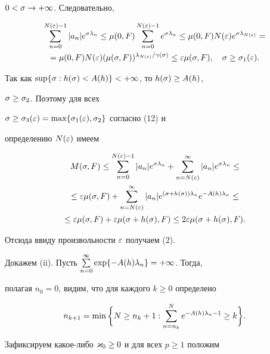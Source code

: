 $0<\sigma\to+\infty$. Следовательно, 


\begin{gather}


\sum_{n=0}^{N(\e)-1}|a_n|e^{\s\l_n}\le


\mu(0,F)\sum_{n=0}^{N(\e)-1}e^{\s\l_n}\le


\mu(0,F)N(\e)e^{\s\l_{N(\e)}}=\notag\\


=\mu(0,F)N(\e)(\m)^{\l_{N(\e)}/\g(\s)}\le


\e\m,\q \s\ge\s_1(\e).


\end{gather}





Так как $\sup\{\sigma:h(\sigma)<A(h)\}<+\infty$, то $h(\sigma)\ge A(h)$,


$\sigma\ge\sigma_2$. Поэтому для всех


$\sigma\ge\sigma_3(\varepsilon)=\max\{\sigma_1(\varepsilon),\sigma_2\}$ согласно (12) и


определению $N(\varepsilon)$ имеем


\begin{gather*}


\M\le\sum_{n=0}^{N(\e)-1}|a_n|e^{\s\l_n}+


\sum_{n=N(\e)}^\i |a_n|e^{\s\l_n}\le\\


\le \e\m+\sum_{n=N(\e)}^\i


|a_n|e^{(\s+h(\s))\l_n}e^{-A(h)\l_n}\le \\


\le\e\m+\e\mu(\s+h(\s),F)\le2\e\mu(\s+h(\s),F).


\end{gather*}


Отсюда ввиду произвольности $\varepsilon$ получаем (2).





Докажем (ii). Пусть $\sum\limits_{n=0}^\infty\exp\{-A(h)\lambda_n\}=+\infty$. Тогда,


полагая $n_0=0$, видим, что для каждого $k\ge 0$ определено 


$$


n_{k+1}=\min\bigg\{N\ge n_k+1:\sum_{n=n_k}^Ne^{-A(h)\l_n-1}\ge


k\bigg\}. 


$$





Зафиксируем какое-либо $\varkappa_0\ge 0$ и для всех $p\ge 1$ положим


